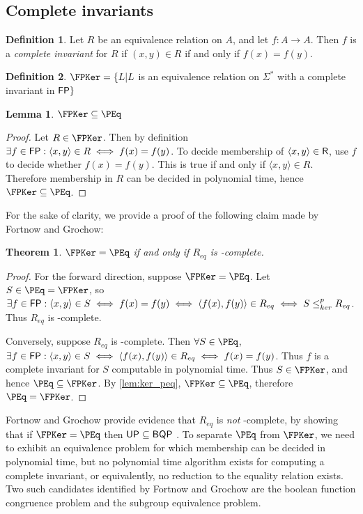 \documentclass{article}
\newtheorem{theorem}{Theorem}[section]
\newtheorem{lemma}[lemma]{Lemma}
\theoremstyle{definition} \newtheorem{definition}[definition]{Definition}
\newcommand{\sigmastar}{\Sigma^{*}} %
\newcommand{\kr}{\leq^{p}_{ker}} %
\newcommand{\defn}[1]{\emph{#1}} %
\newcommand{\pair}[2]{\langle#1,#2\rangle} %
\begin{document}
\subsection{Complete invariants}
\begin{definition}
  Let $R$ be an equivalence relation on $A$, and let $f\colon A\to A$. Then $f$
  is a \defn{complete invariant} for $R$ if $(x,y)\in R$ if and only if
  $f(x)=f(y)$.
\end{definition}
\begin{definition}
  $\FPKer=\{L|L$ is an equivalence relation on $\sigmastar$ with a complete
  invariant in ${\mathsf{FP}}\}$
\end{definition}

\begin{lemma}\label{lem:ker_peq}
  $\FPKer\subseteq\PEq$
\end{lemma}
\begin{proof}
  Let $R\in\FPKer$. Then by definition $\exists f\in\FP: \pair{x}{y}\in R\iff
  f(x)=f(y)$. To decide membership of $\pair{x}{y}\in\R$, use $f$ to decide
  whether $f(x)=f(y)$. This is true if and only if $\pair{x}{y}\in
  R$. Therefore membership in $R$ can be decided in polynomial time, hence
  $\FPKer\subseteq\PEq$.
\end{proof}

For the sake of clarity, we provide a proof of the following claim made by
Fortnow and Grochow:

\begin{theorem}
  $\FPKer=\PEq$ if and only if $R_{eq}$ is \PEq-complete.
\end{theorem}
\begin{proof}
  For the forward direction, suppose $\FPKer=\PEq$. Let $S\in\PEq=\FPKer$, so
  $\exists f\in\FP: \pair{x}{y}\in S\iff f(x)=f(y)\iff \pair{f(x)}{f(y)}\in
  R_{eq}\iff S\kr R_{eq}$. Thus $R_{eq}$ is \PEq-complete.

  Conversely, suppose $R_{eq}$ is \PEq-complete. Then $\forall S\in\PEq$,
  $\exists f\in\FP:\pair{x}{y}\in S\iff\pair{f(x)}{f(y)}\in R_{eq}\iff
  f(x)=f(y)$. Thus $f$ is a complete invariant for $S$ computable in polynomial
  time. Thus $S\in\FPKer$, and hence $\PEq\subseteq\FPKer$. By
  \autoref{lem:ker_peq}, $\FPKer\subseteq\PEq$, therefore $\PEq=\FPKer$.
\end{proof}

Fortnow and Grochow provide evidence that $R_{eq}$ is \emph{not} \PEq-complete,
by showing that if $\FPKer=\PEq$ then ${\mathsf{UP}}\subseteq{\ensuremath{\mathsf{BQP}}}$ \cite{fg09}. To
separate $\PEq$ from $\FPKer$, we need to exhibit an equivalence problem for
which membership can be decided in polynomial time, but no polynomial time
algorithm exists for computing a complete invariant, or equivalently, no
reduction to the equality relation exists. Two such candidates identified by
Fortnow and Grochow are the boolean function congruence problem and the
subgroup equivalence problem.
\end{document}
